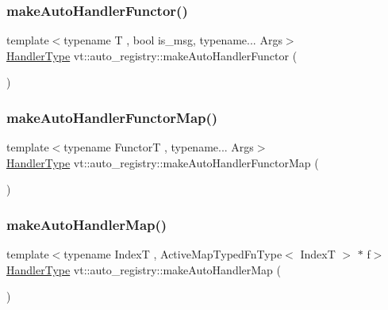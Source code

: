 \subsubsection{\texorpdfstring{make\+Auto\+Handler\+Functor()}{makeAutoHandlerFunctor()}}
{\footnotesize\ttfamily template$<$typename T , bool is\+\_\+msg, typename... Args$>$ \\
\hyperlink{namespacevt_af64846b57dfcaf104da3ef6967917573}{Handler\+Type} vt\+::auto\+\_\+registry\+::make\+Auto\+Handler\+Functor (\begin{DoxyParamCaption}{ }\end{DoxyParamCaption})\hspace{0.3cm}{\ttfamily [inline]}}

\mbox{\label{namespacevt_1_1auto__registry_a64989cf40ed8fc5266f9eb67607f4842}} 
\subsubsection{\texorpdfstring{make\+Auto\+Handler\+Functor\+Map()}{makeAutoHandlerFunctorMap()}}
{\footnotesize\ttfamily template$<$typename FunctorT , typename... Args$>$ \\
\hyperlink{namespacevt_af64846b57dfcaf104da3ef6967917573}{Handler\+Type} vt\+::auto\+\_\+registry\+::make\+Auto\+Handler\+Functor\+Map (\begin{DoxyParamCaption}{ }\end{DoxyParamCaption})\hspace{0.3cm}{\ttfamily [inline]}}

\mbox{\label{namespacevt_1_1auto__registry_a07288f368e86daba0e0045a8e7bfda92}} 
\subsubsection{\texorpdfstring{make\+Auto\+Handler\+Map()}{makeAutoHandlerMap()}}
{\footnotesize\ttfamily template$<$typename IndexT , Active\+Map\+Typed\+Fn\+Type$<$ Index\+T $>$ $\ast$ f$>$ \\
\hyperlink{namespacevt_af64846b57dfcaf104da3ef6967917573}{Handler\+Type} vt\+::auto\+\_\+registry\+::make\+Auto\+Handler\+Map (\begin{DoxyParamCaption}{ }\end{DoxyParamCaption})\hspace{0.3cm}{\ttfamily [inline]}}

